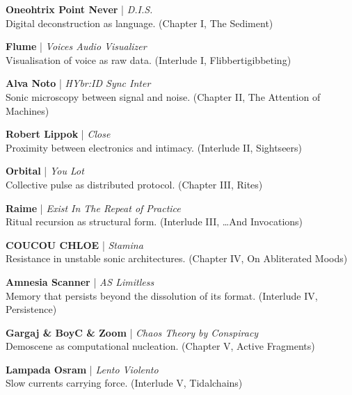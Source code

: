 

\vspace{-0.5em}
{\footnotesize\sffamily

\noindent\textbf{Oneohtrix Point Never} | \textit{D.I.S.}\\
Digital deconstruction as language. (Chapter I, The Sediment)

\smallskip

\noindent\textbf{Flume} | \textit{Voices Audio Visualizer}\\
Visualisation of voice as raw data. (Interlude I, Flibbertigibbeting)

\smallskip

\noindent\textbf{Alva Noto} | \textit{HYbr:ID Sync Inter}\\
Sonic microscopy between signal and noise. (Chapter II, The Attention of Machines)

\smallskip

\noindent\textbf{Robert Lippok} | \textit{Close}\\
Proximity between electronics and intimacy. (Interlude II, Sightseers)

\smallskip

\noindent\textbf{Orbital} | \textit{You Lot}\\
Collective pulse as distributed protocol. (Chapter III, Rites)

\smallskip

\noindent\textbf{Raime} | \textit{Exist In The Repeat of Practice}\\
Ritual recursion as structural form. (Interlude III, \dots And Invocations)

\smallskip

\noindent\textbf{COUCOU CHLOE} | \textit{Stamina}\\
Resistance in unstable sonic architectures. (Chapter IV, On Abliterated Moods)

\smallskip

\noindent\textbf{Amnesia Scanner} | \textit{AS Limitless}\\
Memory that persists beyond the dissolution of its format. (Interlude IV, Persistence)

\smallskip

\noindent\textbf{Gargaj \& BoyC \& Zoom} | \textit{Chaos Theory by Conspiracy}\\
Demoscene as computational nucleation. (Chapter V, Active Fragments)

\smallskip

\noindent\textbf{Lampada Osram} | \textit{Lento Violento}\\
Slow currents carrying force. (Interlude V, Tidalchains)

}
